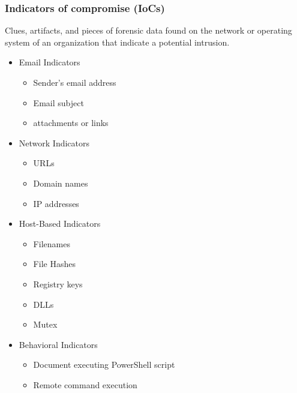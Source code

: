 \subsubsection{Indicators of compromise (IoCs)}
Clues, artifacts, and pieces of forensic data found on the network or operating system of an organization that indicate a potential intrusion.
\begin{itemize}
    \item Email Indicators
    \begin{itemize}
        \item Sender's email address
        \item Email subject
        \item attachments or links
    \end{itemize}
    \item Network Indicators
    \begin{itemize}
        \item URLs
        \item Domain names
        \item IP addresses
    \end{itemize}
    \item Host-Based Indicators
    \begin{itemize}
        \item Filenames
        \item File Hashes
        \item Registry keys
        \item DLLs
        \item Mutex
    \end{itemize}
    \item Behavioral Indicators
    \begin{itemize}
        \item Document executing PowerShell script
        \item Remote command execution
    \end{itemize}
\end{itemize}

